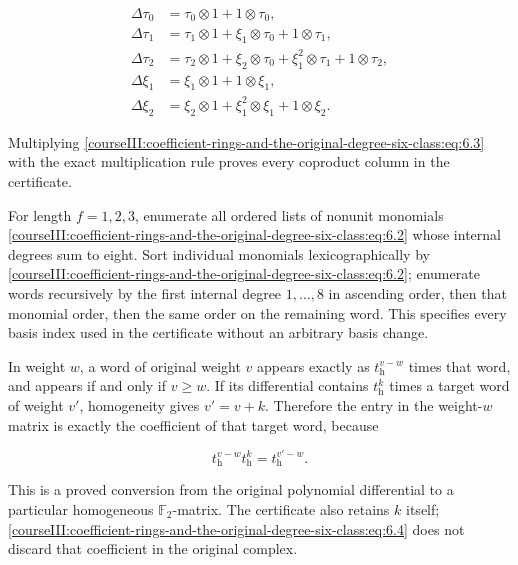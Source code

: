 \begin{equation}
\begin{aligned}
 \Delta\tau_0&=\tau_0\otimes1+1\otimes\tau_0,\\
 \Delta\tau_1&=\tau_1\otimes1+\xi_1\otimes\tau_0+1\otimes\tau_1,\\
 \Delta\tau_2&=\tau_2\otimes1+\xi_2\otimes\tau_0+
                             \xi_1^2\otimes\tau_1+1\otimes\tau_2,\\
 \Delta\xi_1&=\xi_1\otimes1+1\otimes\xi_1,\\
 \Delta\xi_2&=\xi_2\otimes1+\xi_1^2\otimes\xi_1+1\otimes\xi_2.
 \end{aligned}
 \label{courseIII:coefficient-rings-and-the-original-degree-six-class:eq:6.3}
\end{equation}

Multiplying \eqref{courseIII:coefficient-rings-and-the-original-degree-six-class:eq:6.3} with the exact multiplication rule proves every coproduct column in the certificate.

For length \(f=1,2,3\), enumerate all ordered lists of nonunit monomials \eqref{courseIII:coefficient-rings-and-the-original-degree-six-class:eq:6.2} whose internal degrees sum to eight. Sort individual monomials lexicographically by \eqref{courseIII:coefficient-rings-and-the-original-degree-six-class:eq:6.2}; enumerate words recursively by the first internal degree \(1,\ldots,8\) in ascending order, then that monomial order, then the same order on the remaining word. This specifies every basis index used in the certificate without an arbitrary basis change.

In weight \(w\), a word of original weight \(v\) appears exactly as
\(t_{\mathrm h}^{v-w}\) times that word, and appears if and only if \(v\geq w\).
If its differential contains \(t_{\mathrm h}^k\) times a target word of weight \(v'\), homogeneity gives \(v'=v+k\). Therefore the entry in the weight-\(w\) matrix is exactly the coefficient of that target word, because

\begin{equation}
t_{\mathrm h}^{v-w}t_{\mathrm h}^k
                    =t_{\mathrm h}^{v'-w}.
 \label{courseIII:coefficient-rings-and-the-original-degree-six-class:eq:6.4}
\end{equation}

This is a proved conversion from the original polynomial differential to a particular homogeneous \(\mathbb F_2\)-matrix. The certificate also retains \(k\) itself; \eqref{courseIII:coefficient-rings-and-the-original-degree-six-class:eq:6.4} does not discard that coefficient in the original complex.

